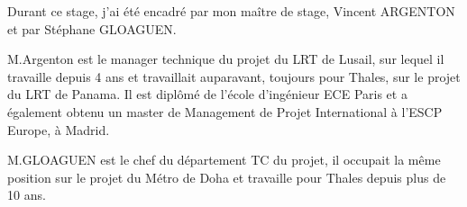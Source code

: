 Durant ce stage, j'ai été encadré par mon maître de stage, Vincent ARGENTON et par Stéphane GLOAGUEN.

M.Argenton est le manager technique du projet du \gls{LRT} de Lusail, sur lequel il travaille depuis 4 ans et travaillait auparavant, toujours pour Thales, sur le projet du \gls{LRT} de Panama. Il est diplômé de l'école d'ingénieur ECE Paris et a également obtenu un master de Management de Projet International à l'ESCP Europe, à Madrid.

M.GLOAGUEN est le chef du département  \gls{TC} du projet, il occupait la même position sur le projet du Métro de Doha et travaille pour Thales depuis plus de 10 ans.
